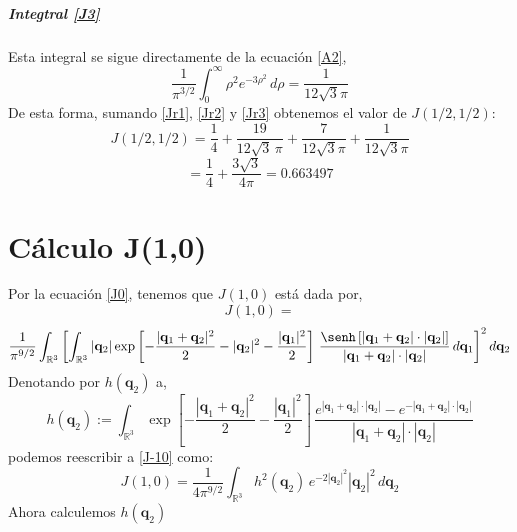 \documentclass[12pt]{book}
\numberwithin{equation}{chapter}
\def\q{\mathbf{q}}
\def\R{\mathbb{R}}
\def\r{\rho}
\begin{document}
\paragraph{Integtral \eqref{J3}}
Esta integral se sigue directamente de la ecuaci\'on \eqref{A2},
\begin{equation}\label{Jr3}
\frac{1}{\pi^{3/2}} \int_{0}^{\infty} \r^{2} e^{-3\r^{2}} \, d\r= \frac{1}{12\sqrt{3}\pi}
\end{equation}
De esta forma, sumando \eqref{Jr1}, \eqref{Jr2} y \eqref{Jr3} obtenemos el valor de $J(1/2,1/2)$:
$$J(1/2,1/2)= \frac{1}{4} + \frac{19}{12 \sqrt{3}\, \pi} + \frac{7}{12\sqrt{3}\pi}+\frac{1}{12\sqrt{3}\pi} $$
\begin{equation}
= \frac{1}{4}+\frac{3\sqrt{3}}{4\pi} = 0.663497
\end{equation}


\chapter{C\'alculo J(1,0)}
Por la ecuaci\'on \eqref{J0}, tenemos que $J(1,0)$ est\'a dada por,
$$J(1,0)= $$
\begin{equation}\label{J-10}
\frac{1}{\pi^{9/2}} \int_{\R^{3}} \left[ \int_{\R^{3}} |\q_{2}| \exp \left[ -\frac{|\q_{1}+\q_{2}|^{2}}{2} -|\q_{2}|^{2} -\frac{|\q_{1}|^{2}}{2} \right]\, \frac{\senh \left[ |\q_{1}+\q_{2}|\cdot |\q_{2}| \right] }{|\q_{1}+\q_{2}|\cdot |\q_{2}|} \,d\q_{1} \right]^{2} d\q_{2}
\end{equation}
Denotando por $h(\q_{2})$ a,
\begin{equation}\label{hq2}
h(\q_{2}):= \int_{\R^{3}} \exp \left[-\frac{|\q_{1}+\q_{2}|^{2}}{2} -\frac{|\q_{1}|^{2}}{2} \right] \, \frac{ e^{|\q_{1}+\q_{2}|\cdot|\q_{2}|} - e^{-|\q_{1}+\q_{2}|\cdot|\q_{2}|} }{|\q_{1}+\q_{2}|\cdot|\q_{2}|}
\end{equation}
podemos reescribir a \eqref{J-10} como:
\begin{equation}\label{Jh}
J(1,0)= \frac{1}{4\pi^{9/2}} \int_{\R^{3}} h^{2}(\q_{2}) \, e^{-2|\q_{2}|^{2}} |\q_{2}|^{2}\, d\q_{2}
\end{equation}
Ahora calculemos $h(\q_{2})$
\end{document}
